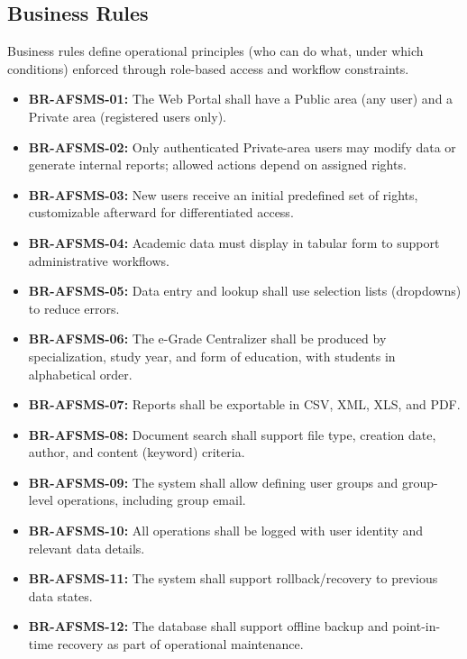 \documentclass[11pt, a4paper]{article}
\begin{document}
\subsection{Business Rules}
Business rules define operational principles (who can do what, under which conditions) enforced through role-based access and workflow constraints.
\begin{itemize}
    \item \textbf{BR-AFSMS-01:} The Web Portal shall have a Public area (any user) and a Private area (registered users only).
    \item \textbf{BR-AFSMS-02:} Only authenticated Private-area users may modify data or generate internal reports; allowed actions depend on assigned rights.
    \item \textbf{BR-AFSMS-03:} New users receive an initial predefined set of rights, customizable afterward for differentiated access.
    \item \textbf{BR-AFSMS-04:} Academic data must display in tabular form to support administrative workflows.
    \item \textbf{BR-AFSMS-05:} Data entry and lookup shall use selection lists (dropdowns) to reduce errors.
    \item \textbf{BR-AFSMS-06:} The e-Grade Centralizer shall be produced by specialization, study year, and form of education, with students in alphabetical order.
    \item \textbf{BR-AFSMS-07:} Reports shall be exportable in CSV, XML, XLS, and PDF.
    \item \textbf{BR-AFSMS-08:} Document search shall support file type, creation date, author, and content (keyword) criteria.
    \item \textbf{BR-AFSMS-09:} The system shall allow defining user groups and group-level operations, including group email.
    \item \textbf{BR-AFSMS-10:} All operations shall be logged with user identity and relevant data details.
    \item \textbf{BR-AFSMS-11:} The system shall support rollback/recovery to previous data states.
    \item \textbf{BR-AFSMS-12:} The database shall support offline backup and point-in-time recovery as part of operational maintenance.
\end{itemize}
\end{document}
